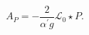 \begin{equation}\label{e-Ap}
A_{P}=-\frac{2}{{\alpha ^{\prime }}g}{\mathcal{L}_{0}}\star P.
\end{equation}%
